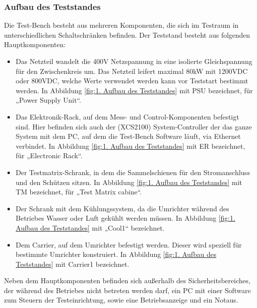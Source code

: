 \subsubsection{Aufbau des Teststandes}
Die Test-Bench besteht aus mehreren Komponenten, die sich im Testraum in unterschiedlichen Schaltschränken befinden.
Der Teststand besteht aus folgenden Hauptkomponenten:
\begin{itemize}

\item Das Netzteil wandelt die 400V Netzspannung in eine isolierte Gleichspannung für den Zwischenkreis um.
Das Netzteil leifert maximal 80kW mit 1200VDC oder 800VDC, welche Werte verwendet werden kann vor Teststart bestimmt werden.
In Abbildung \ref{fig:1. Aufbau des Teststandes} mit PSU bezeichnet, für „Power Supply Unit“.
\item Das Elektronik-Rack, auf dem Mess- und Control-Komponenten befestigt sind.
Hier befinden sich auch der (XCS2100) System-Controller der das ganze System mit dem PC, auf dem die Test-Bench Software läuft, via Ethernet verbindet.
In Abbildung \ref{fig:1. Aufbau des Teststandes} mit ER bezeichnet, für „Electronic Rack“.
\item Der Testmatrix-Schrank, in dem die Sammelschienen für den Stromanschluss und den Schützen sitzen.
In Abbildung \ref{fig:1. Aufbau des Teststandes} mit TM bezeichnet, für „Test Matrix cabine“.
\item Der Schrank mit dem Kühlungssystem, da die Umrichter während des Betriebes Wasser oder Luft gekühlt werden müssen.
In Abbildung \ref{fig:1. Aufbau des Teststandes} mit „Cool1“ bezeichnet.
\item Dem Carrier, auf dem Umrichter befestigt werden.
Dieser wird speziell für bestimmte Umrichter konstruiert.
In Abbildung \ref{fig:1. Aufbau des Teststandes} mit Carrier1 bezeichnet.

\end{itemize}

Neben dem Hauptkomponenten befinden sich außerhalb des Sicherheitsbereiches, der während des Betriebes nicht betreten werden darf,
ein PC mit einer Software zum Steuern der Testeinrichtung, sowie eine Betriebsanzeige und ein Notaus. \cite*{Main_Manuel_USTB2018}

